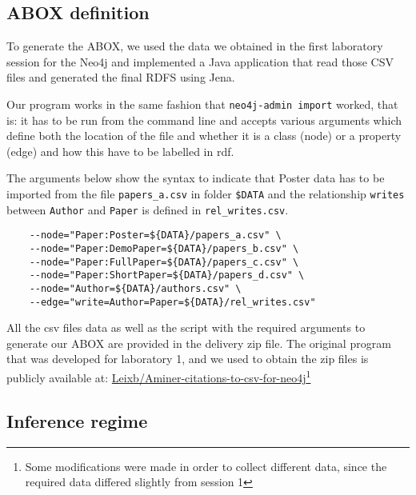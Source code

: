 \pagebreak
\subsection{ABOX definition}%
\label{sub:abox}


To generate the ABOX, we used the data we obtained in the first laboratory session
for the Neo4j and implemented a Java application that read those CSV files and generated
the final RDFS using Jena.

Our program works in the same fashion that \texttt{neo4j-admin import} worked, that
is: it has to be run from the command line and accepts various arguments which
define both the location of the file and whether it is a class (node) or a property (edge)
and how this have to be labelled in rdf. 

The arguments below show the syntax to indicate that Poster data has to be imported from
the file \texttt{papers\_a.csv} in folder \texttt{\$DATA} and the relationship \texttt{writes}
between \texttt{Author} and \texttt{Paper} is defined in \texttt{rel\_writes.csv}.

\begin{verbatim}
    --node="Paper:Poster=${DATA}/papers_a.csv" \
    --node="Paper:DemoPaper=${DATA}/papers_b.csv" \
    --node="Paper:FullPaper=${DATA}/papers_c.csv" \
    --node="Paper:ShortPaper=${DATA}/papers_d.csv" \
    --node="Author=${DATA}/authors.csv" \
    --edge="write=Author=Paper=${DATA}/rel_writes.csv"
\end{verbatim}

All the csv files data as well as the script with the required arguments to generate
our ABOX are provided in the delivery zip file. The original program that was developed
for laboratory 1, and we used to obtain the zip files is publicly available at:
\href{https://github.com/Leixb/Aminer-citations-to-csv-for-neo4j/tree/sdm-lab3}{Leixb/Aminer-citations-to-csv-for-neo4j}\footnote{Some modifications were made in order to collect different data, since the required data differed slightly from session 1}

\pagebreak
\subsection{Inference regime}%
\label{sub:inference}

